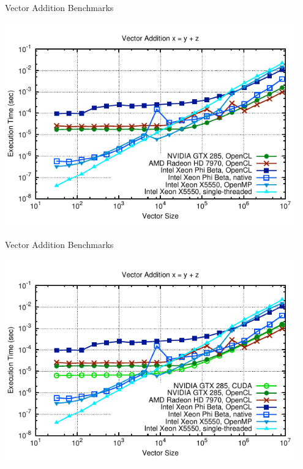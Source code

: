 \begin{frame}{Vector Addition Benchmarks}
  \begin{center}
   \includegraphics[width=0.95\textwidth]{figures/vector-timings-6}
  \end{center}
\end{frame}

\begin{frame}{Vector Addition Benchmarks}
  \begin{center}
   \includegraphics[width=0.95\textwidth]{figures/vector-timings-7}
  \end{center}
\end{frame}



